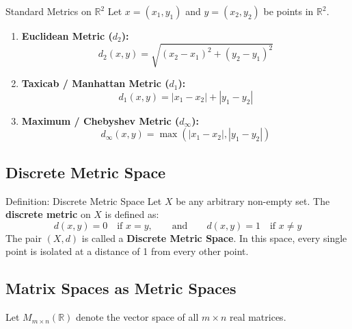 \documentclass[11pt,a4paper]{article}
\begin{document}
\begin{formulabox}{Standard Metrics on $\mathbb{R}^2$}
Let $x = (x_1, y_1)$ and $y = (x_2, y_2)$ be points in $\mathbb{R}^2$.
\begin{enumerate}
    \item \textbf{Euclidean Metric ($d_2$):}
    \begin{equation}
        d_2(x, y) = \sqrt{(x_2 - x_1)^2 + (y_2 - y_1)^2}
    \end{equation}
    
    \item \textbf{Taxicab / Manhattan Metric ($d_1$):}
    \begin{equation}
        d_1(x, y) = |x_1 - x_2| + |y_1 - y_2|
    \end{equation}
    
    \item \textbf{Maximum / Chebyshev Metric ($d_\infty$):}
    \begin{equation}
        d_\infty(x, y) = \max\left( |x_1 - x_2|, |y_1 - y_2| \right)
    \end{equation}
\end{enumerate}
\end{formulabox}

\subsection{Discrete Metric Space}

\begin{defbox}{Definition: Discrete Metric Space}
Let $X$ be any arbitrary non-empty set. The \textbf{discrete metric} on $X$ is defined as:
\begin{equation}
    d(x, y) = 0 \quad \text{if } x = y, \qquad \text{and} \qquad d(x, y) = 1 \quad \text{if } x \neq y
\end{equation}
The pair $(X, d)$ is called a \textbf{Discrete Metric Space}. In this space, every single point is isolated at a distance of 1 from every other point.
\end{defbox}

\subsection{Matrix Spaces as Metric Spaces}

Let $M_{m \times n}(\mathbb{R})$ denote the vector space of all $m \times n$ real matrices.
\end{document}
